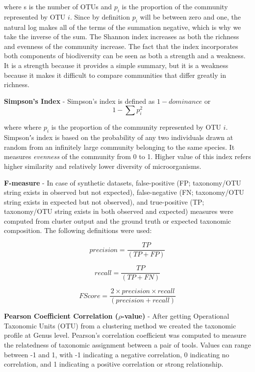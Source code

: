 \documentclass[10pt, conference, compsocconf]{IEEEtran}
\begin{document}
where s is the number of OTUs and $p_i$ is the proportion of the community represented by OTU $i$. Since by definition $p_i$ will be between zero and one, the natural log makes all of the terms of the summation negative, which is why we take the inverse of the sum. The Shannon index increases as both the richness and evenness of the community increase. The fact that the index incorporates both components of biodiversity can be seen as both a strength and a weakness. It is a strength because it provides a simple summary, but it is a weakness because it makes it difficult to compare communities that differ greatly in richness.

\hspace*{4mm}\textbf{Simpson's Index} - Simpson’s index is defined as ${1-dominance}$ or
\begin{equation}
1 - \sum p_i^2
\end{equation}

where where $p_i$ is the proportion of the community represented by OTU $i$. Simpsonʼs index is based on the probability of any two individuals drawn at random from an infinitely large community belonging to the same species. It measures \textit{evenness} of the community from 0 to 1. Higher value of this index refers higher similarity and relatively lower diversity of microorganisms.

\hspace*{4mm}\textbf{F-measure} - In case of 
synthetic datasets, false-positive (FP; taxonomy/OTU string 
exists in observed but not expected), false-negative
(FN; taxonomy/OTU string exists in expected but not observed), and 
true-positive (TP; taxonomy/OTU string exists in both observed and expected) measures were computed from 
cluster output and the ground truth or expected taxonomic composition. The following definitions were used:

\begin{equation}
precision = \frac{TP}{(TP + FP)}
\end{equation}

\begin{equation}
recall = \frac{TP}{(TP + FN)}
\end{equation}

\begin{equation}
F Score = \frac{2 \times precision \times recall}{(precision + recall)}
\end{equation}


\hspace*{4mm}\textbf{Pearson Coefficient Correlation ($\rho$-value)} - After getting Operational Taxonomic Units (OTU) from a clustering method we created the taxonomic profile at Genus level. Pearson’s correlation coefficient was computed to measure the relatedness of taxonomic assignment between a pair of tools. Values can range between -1 and 1, with -1 indicating a negative correlation, 0 indicating no correlation, and 1 indicating a positive correlation or strong relationship.
\end{document}
